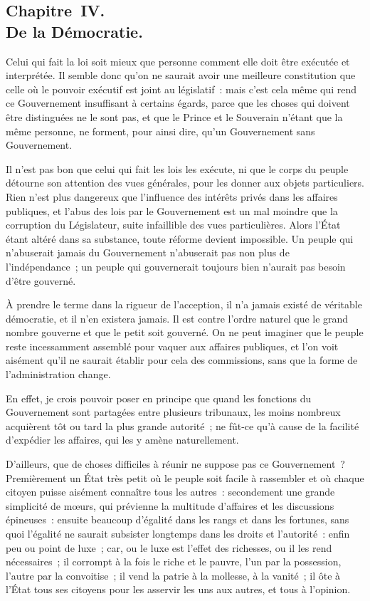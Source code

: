 \documentclass[french,twoside]{book} %
\begin{document}
\subsection[{Chapitre IV. De la Démocratie.}]{Chapitre IV. \\
De la Démocratie.}
\noindent Celui qui fait la loi soit mieux que personne comment elle doit être exécutée et interprétée. Il semble donc qu’on ne saurait avoir une meilleure constitution que celle où le pouvoir exécutif est joint au législatif : mais c’est cela même qui rend ce Gouvernement insuffisant à certains égards, parce que les choses qui doivent être distinguées ne le sont pas, et que le Prince et le Souverain n’étant que la même personne, ne forment, pour ainsi dire, qu’un Gouvernement sans Gouvernement.\par
Il n’est pas bon que celui qui fait les lois les exécute, ni que le corps du peuple détourne son attention des vues générales, pour les donner aux objets particuliers. Rien n’est plus dangereux que l’influence des intérêts privés dans les affaires publiques, et l’abus des lois par le Gouvernement est un mal moindre que la corruption du Législateur, suite infaillible des vues particulières. Alors l’État étant altéré dans sa substance, toute réforme devient impossible. Un peuple qui n’abuserait jamais du Gouvernement n’abuserait pas non plus de l’indépendance ; un peuple qui gouvernerait toujours bien n’aurait pas besoin d’être gouverné.\par
À prendre le terme dans la rigueur de l’acception, il n’a jamais existé de véritable démocratie, et il n’en existera jamais. Il est contre l’ordre naturel que le grand nombre gouverne et que le petit soit gouverné. On ne peut imaginer que le peuple reste incessamment assemblé pour vaquer aux affaires publiques, et l’on voit aisément qu’il ne saurait établir pour cela des commissions, sans que la forme de l’administration change.\par
En effet, je crois pouvoir poser en principe que quand les fonctions du Gouvernement sont partagées entre plusieurs tribunaux, les moins nombreux acquièrent tôt ou tard la plus grande autorité ; ne fût-ce qu’à cause de la facilité d’expédier les affaires, qui les y amène naturellement.\par
D’ailleurs, que de choses difficiles à réunir ne suppose pas ce Gouvernement ? Premièrement un État très petit où le peuple soit facile à rassembler et où chaque citoyen puisse aisément connaître tous les autres : secondement une grande simplicité de mœurs, qui prévienne la multitude d’affaires et les discussions épineuses : ensuite beaucoup d’égalité dans les rangs et dans les fortunes, sans quoi l’égalité ne saurait subsister longtemps dans les droits et l’autorité : enfin peu ou point de luxe ; car, ou le luxe est l’effet des richesses, ou il les rend nécessaires ; il corrompt à la fois le riche et le pauvre, l’un par la possession, l’autre par la convoitise ; il vend la patrie à la mollesse, à la vanité ; il ôte à l’État tous ses citoyens pour les asservir les uns aux autres, et tous à l’opinion.\par
\end{document}
